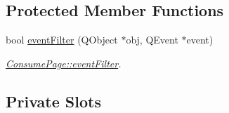 \subsection*{Protected Member Functions}
\begin{DoxyCompactItemize}
\item 
bool \mbox{\hyperlink{class_consume_page_a1c1ce4b09089b923deb0fd178418cb99}{event\+Filter}} (Q\+Object $\ast$obj, Q\+Event $\ast$event)
\begin{DoxyCompactList}\small\item\em \mbox{\hyperlink{class_consume_page_a1c1ce4b09089b923deb0fd178418cb99}{Consume\+Page\+::event\+Filter}}. \end{DoxyCompactList}\end{DoxyCompactItemize}
\subsection*{Private Slots}
